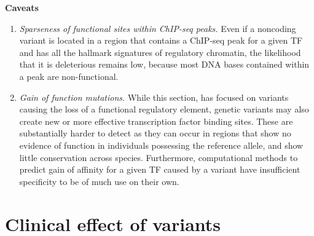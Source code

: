 \textbf{Caveats}
	\begin{enumerate}[label=\roman*]
	
	\item \textit{Sparseness of functional sites within ChIP-seq peaks.} Even if a noncoding variant is located in a region that contains a ChIP-seq peak for a given TF and has all the hallmark signatures of regulatory chromatin, the likelihood that it is deleterious remains low, because most DNA bases contained within a peak are non-functional. 
	
	\item \textit{Gain of function mutations.} While this section, has focused on variants causing the loss of a functional regulatory element, genetic variants may also create new or more effective transcription factor binding sites. These are substantially harder to detect as they can occur in regions that show no evidence of function in individuals possessing the reference allele, and show little conservation across species. Furthermore, computational methods to predict gain of affinity for a given TF caused by a variant have insufficient specificity to be of much use on their own. 
	
	\end{enumerate}

\section{ Clinical effect of variants}

